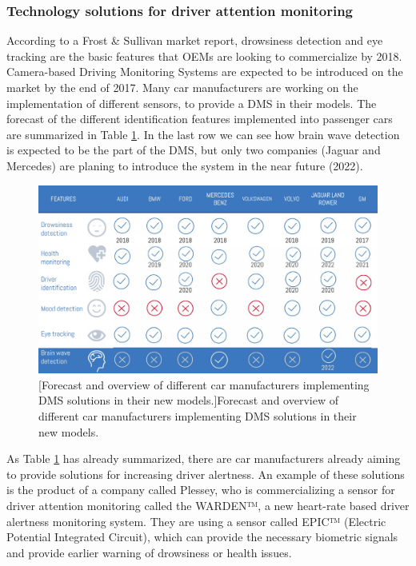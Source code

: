 \documentclass[letterpaper,10pt]{article}
\begin{document}
\subsubsection{Technology solutions for driver attention monitoring}

According to a Frost & Sullivan market report, drowsiness detection and eye tracking are the basic features that OEMs are looking to commercialize by 2018. Camera-based Driving Monitoring Systems are expected to be introduced on the market by the end of 2017. \cite{f&s_car}  Many car manufacturers are working on the implementation of different sensors, to provide a DMS in their models. The forecast of the different identification features implemented into passenger cars are summarized in Table \ref{fig:cars}. In the last row we can see how brain wave detection is expected to be the part of the DMS, but only two companies (Jaguar and Mercedes) are planing to introduce the system in the near future (2022).

\begin{figure}[h]
\centering
\includegraphics[scale=0.26]{dms.jpg}
[Forecast and overview of different car manufacturers implementing DMS solutions in their new models.]{Forecast and overview of different car manufacturers implementing DMS solutions in their new models. \cite{f&s_car}}
\label{fig:cars}
\end{figure}


As Table \ref{fig:cars} has already summarized, there are car manufacturers already aiming to provide solutions for increasing driver alertness. An example of these solutions is the product of a company called Plessey, who is commercializing a sensor for driver attention monitoring called the WARDEN™, a new heart-rate based driver alertness monitoring system. They are using a sensor called EPIC™ (Electric Potential Integrated Circuit), which can provide the necessary biometric signals and provide earlier warning of drowsiness or health issues.
\cite{plessey}
\end{document}
